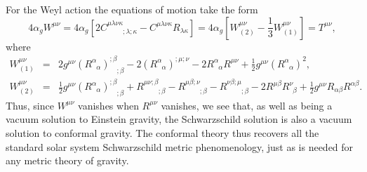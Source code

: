 \documentclass[preprint,aps]{revtex4}
\begin{document}
For the Weyl action the equations of motion take the form \cite{Mannheim2006} 
%
\begin{equation}
4\alpha_g W^{\mu\nu}=4\alpha_g\left[
2C^{\mu\lambda\nu\kappa}_
{\phantom{\mu\lambda\nu\kappa};\lambda;\kappa}-
C^{\mu\lambda\nu\kappa}R_{\lambda\kappa}\right]=4\alpha_g\left[W^{\mu
\nu}_{(2)}-\frac{1}{3}W^{\mu\nu}_{(1)}\right]=T^{\mu\nu},
\label{188}
\end{equation}
% 
where
%                                                                               
\begin{eqnarray}
W^{\mu \nu}_{(1)}&=&
2g^{\mu\nu}(R^{\alpha}_{\phantom{\alpha}\alpha})          
^{;\beta}_{\phantom{;\beta};\beta}                                              
-2(R^{\alpha}_{\phantom{\alpha}\alpha})^{;\mu;\nu}                           
-2 R^{\alpha}_{\phantom{\alpha}\alpha}
R^{\mu\nu}                              
+\frac{1}{2}g^{\mu\nu}(R^{\alpha}_{\phantom{\alpha}\alpha})^2,
\nonumber\\
W^{\mu \nu}_{(2)}&=&
\frac{1}{2}g^{\mu\nu}(R^{\alpha}_{\phantom{\alpha}\alpha})   
^{;\beta}_{\phantom{;\beta};\beta}+
R^{\mu\nu;\beta}_{\phantom{\mu\nu;\beta};\beta}                     
 -R^{\mu\beta;\nu}_{\phantom{\mu\beta;\nu};\beta}                        
-R^{\nu \beta;\mu}_{\phantom{\nu \beta;\mu};\beta}                          
 - 2R^{\mu\beta}R^{\nu}_{\phantom{\nu}\beta}                                    
+\frac{1}{2}g^{\mu\nu}R_{\alpha\beta}R^{\alpha\beta}.
\label{108}
\end{eqnarray}                                 
%   
Thus, since $W^{\mu\nu}$ vanishes when $R^{\mu\nu}$ vanishes, we see that, as well as being a vacuum solution to Einstein gravity, the Schwarzschild solution is also a vacuum solution to conformal gravity. The conformal theory thus recovers all the standard solar system Schwarzschild metric phenomenology, just as is needed for any metric theory of gravity.
\end{document}
